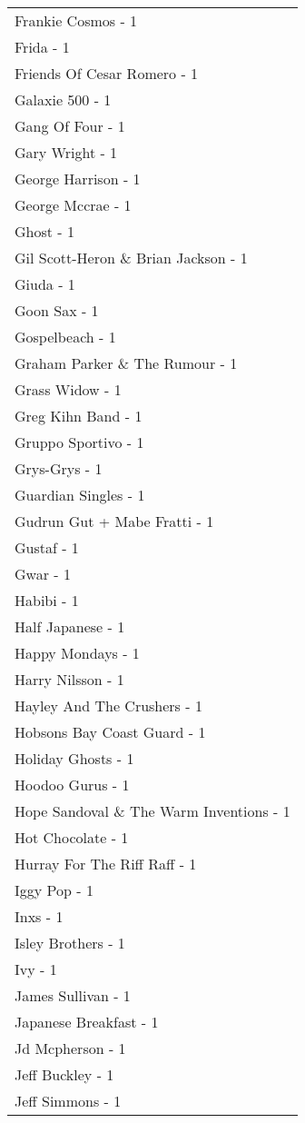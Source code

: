 \documentclass[
]{article}
\begin{document}
\begin{longtable}{l}
Frankie Cosmos - 1 \\ 
Frida - 1 \\ 
Friends Of Cesar Romero - 1 \\ 
Galaxie 500 - 1 \\ 
Gang Of Four - 1 \\ 
Gary Wright - 1 \\ 
George Harrison - 1 \\ 
George Mccrae - 1 \\ 
Ghost - 1 \\ 
Gil Scott-Heron \& Brian Jackson - 1 \\ 
Giuda - 1 \\ 
Goon Sax - 1 \\ 
Gospelbeach - 1 \\ 
Graham Parker \& The Rumour - 1 \\ 
Grass Widow - 1 \\ 
Greg Kihn Band - 1 \\ 
Gruppo Sportivo - 1 \\ 
Grys-Grys - 1 \\ 
Guardian Singles - 1 \\ 
Gudrun Gut + Mabe Fratti - 1 \\ 
Gustaf - 1 \\ 
Gwar - 1 \\ 
Habibi - 1 \\ 
Half Japanese - 1 \\ 
Happy Mondays - 1 \\ 
Harry Nilsson - 1 \\ 
Hayley And The Crushers - 1 \\ 
Hobsons Bay Coast Guard - 1 \\ 
Holiday Ghosts - 1 \\ 
Hoodoo Gurus - 1 \\ 
Hope Sandoval \& The Warm Inventions - 1 \\ 
Hot Chocolate - 1 \\ 
Hurray For The Riff Raff - 1 \\ 
Iggy Pop - 1 \\ 
Inxs - 1 \\ 
Isley Brothers - 1 \\ 
Ivy - 1 \\ 
James Sullivan - 1 \\ 
Japanese Breakfast - 1 \\ 
Jd Mcpherson - 1 \\ 
Jeff Buckley - 1 \\ 
Jeff Simmons - 1 \\ 

\end{longtable}
\end{document}
